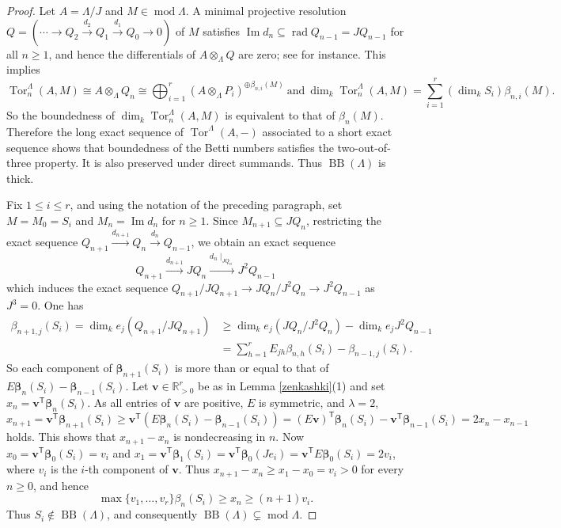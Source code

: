 \documentclass{amsart}
\theoremstyle{definition}
\theoremstyle{remark}
\numberwithin{equation}{thm}
\def\BB{\operatorname{BB}}
\def\dim{\operatorname{dim}}
\def\image{\operatorname{Im}}
\def\L{\Lambda}
\def\le{\leqslant}
\def\ge{\geqslant}
\def\mod{\operatorname{mod}}
\def\rad{\operatorname{rad}}
\def\T{\mathsf{T}}
\def\Tor{\operatorname{Tor}}
\def\bfv{\mathbf{v}}
\begin{document}
\begin{proof}
Let $A=\L/J$ and $M\in\mod\L$. 
A minimal projective resolution $Q=(\cdots\to Q_2\xrightarrow{d_2} Q_1\xrightarrow{d_1} Q_0\to 0)$ of $M$ satisfies $\image d_n\subseteq\rad Q_{n-1}=JQ_{n-1}$ for all $n\ge 1$, and hence the differentials of $A\otimes_\L Q$ are zero; see \cite[Section 4]{I} for instance.
This implies
$$
\Tor_n^\L(A,M)\cong A\otimes_\L Q_n\cong\bigoplus_{i=1}^r(A\otimes_\L P_i)^{\oplus\beta_{n,i}(M)} \ \text{and}\  \dim_k\Tor_n^\L(A,M)=\sum_{i=1}^r(\dim_kS_i)\beta_{n,i}(M).
$$
So the boundedness of $\dim_k\Tor_n^\L(A,M)$ is equivalent to that of $\beta_n(M)$. Therefore the long exact sequence of $\Tor^\L(A,-)$ associated to a short exact sequence shows that boundedness of the Betti numbers satisfies the two-out-of-three property. It is also preserved under direct summands. Thus $\BB(\L)$ is thick.

Fix $1\le i\le r$, and using the notation of the preceding paragraph, set $M=M_0=S_i$ and $M_n=\image d_n$ for $n\ge1$.
Since $M_{n+1}\subseteq JQ_n$, restricting the exact sequence $Q_{n+1}\xrightarrow{d_{n+1}} Q_n\xrightarrow{d_n} Q_{n-1}$, we obtain an exact sequence
$$
Q_{n+1}\xrightarrow{d_{n+1}} JQ_n\xrightarrow{d_n\mid_{J Q_n}} J^2Q_{n-1}
$$ 
which induces the exact sequence $Q_{n+1}/J Q_{n+1}\to J Q_n/J^2Q_n\to J^2Q_{n-1}$ as $J^3=0$. One has
\begin{align*}
\beta_{n+1,j}(S_i)=\dim_k e_j (Q_{n+1}/J Q_{n+1})&\ge\dim_k e_j (J Q_n/J^2Q_n)-\dim_k e_j J^2Q_{n-1}\\ &=\sum_{h=1}^r E_{j h} \beta_{n,h}(S_i)-\beta_{n-1,j}(S_i).
\end{align*}
So each component of $\boldsymbol{\beta}_{n+1}(S_i)$ is more than or equal to that of $E\boldsymbol{\beta}_n(S_i)-\boldsymbol{\beta}_{n-1}(S_i)$.
Let $\bfv\in\mathbb{R}_{>0}^r$ be as in Lemma \ref{zenkashki}(1) and set $x_n=\bfv^{\T}\boldsymbol{\beta}_n(S_i)$.
As all entries of $\bfv$ are positive, $E$ is symmetric, and $\lambda=2$, 
$$
x_{n+1}=\bfv^{\T}\boldsymbol{\beta}_{n+1}(S_i)\ge \bfv^{\T}(E\boldsymbol{\beta}_n(S_i)-\boldsymbol{\beta}_{n-1}(S_i))=(E\bfv)^{\T}\boldsymbol{\beta}_n(S_i)-\bfv^{\T}\boldsymbol{\beta}_{n-1}(S_i)=2x_n-x_{n-1}
$$
holds. This shows that $x_{n+1}-x_n$ is nondecreasing in $n$.
Now $x_0=\bfv^{\T}\boldsymbol{\beta}_0(S_i)=v_i$ and $x_1=\bfv^{\T}\boldsymbol{\beta}_1(S_i)=\bfv^{\T}\boldsymbol{\beta}_0(J e_i)=\bfv^{\T}E\boldsymbol{\beta}_0(S_i)=2v_i$, where $v_i$ is the $i$-th component of $\bfv$.
Thus $x_{n+1}-x_n\ge x_1-x_0=v_i>0$ for every $n\ge0$, and hence
$$
\max\{v_1,\ldots,v_r\}\beta_n(S_i)\ge x_n\ge(n+1)v_i.
$$
Thus $S_i\notin\BB(\L)$, and consequently $\BB(\L)\subsetneq\mod\L$.


\end{proof}
\end{document}
